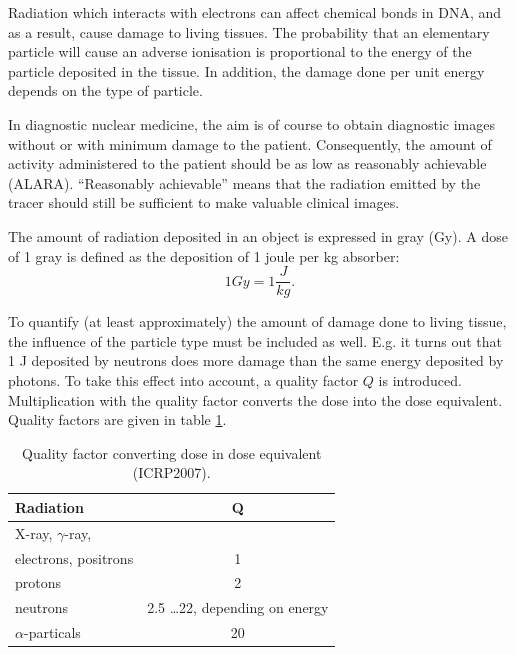 \documentclass[11pt,oneside]{book}
\begin{document}
Radiation which interacts with electrons can affect chemical bonds in
DNA, and as a result, cause damage to living tissues. The probability
that an elementary particle will cause an adverse ionisation is
proportional to the energy of the particle deposited in the tissue. In
addition, the damage done per unit energy depends on the type of
particle.

In diagnostic nuclear medicine, the aim is of course to obtain
diagnostic images without or with minimum damage to the
patient. Consequently, the amount of activity administered to the
patient should be as low as reasonably achievable (ALARA).
``Reasonably achievable'' means that the radiation emitted by the
tracer should still be sufficient to make valuable clinical images.

The amount of radiation deposited in an object is expressed in gray (Gy). A
dose of 1 gray is defined as the deposition of 1 joule per kg absorber:
\begin{equation}
  1 Gy = 1 \frac{J}{kg}.
\end{equation}

To quantify (at least approximately) the amount of damage done to living
tissue, the influence of the particle type must be included as well. E.g. it
turns out that 1 J deposited by neutrons does more damage than the same energy
deposited by photons. To take this effect into account, a quality factor $Q$
is introduced. Multiplication with the quality factor converts the dose into
the dose equivalent. Quality factors are given in table \ref{tab:qualfactor}.
%
\begin{table}[h]
\begin{center}
\caption{Quality factor converting dose in dose equivalent (ICRP2007).}
\label{tab:qualfactor}
\begin{tabular}{|l|c|}
\hline
Radiation                          & Q \\
\hline
\hline
X-ray, $\gamma$-ray,               & \\
electrons, positrons               & 1 \\
\hline
protons                            & 2 \\
neutrons                           & 2.5 \ldots 22, depending on energy \\
\hline
$\alpha$-particals                 & 20 \\
\hline
\end{tabular}
\end{center}
\end{table}
\end{document}
